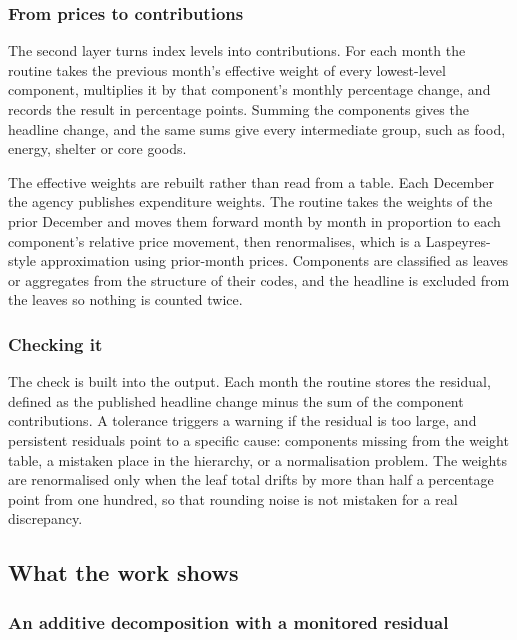 \documentclass[
  british,
  a4paper,
]{article}
\begin{document}
\subsubsection{From prices to
contributions}\label{from-prices-to-contributions}

The second layer turns index levels into contributions. For each month
the routine takes the previous month's effective weight of every
lowest-level component, multiplies it by that component's monthly
percentage change, and records the result in percentage points. Summing
the components gives the headline change, and the same sums give every
intermediate group, such as food, energy, shelter or core goods.

The effective weights are rebuilt rather than read from a table. Each
December the agency publishes expenditure weights. The routine takes the
weights of the prior December and moves them forward month by month in
proportion to each component's relative price movement, then
renormalises, which is a Laspeyres-style approximation using prior-month
prices. Components are classified as leaves or aggregates from the
structure of their codes, and the headline is excluded from the leaves
so nothing is counted twice.

\subsubsection{Checking it}\label{checking-it}

The check is built into the output. Each month the routine stores the
residual, defined as the published headline change minus the sum of the
component contributions. A tolerance triggers a warning if the residual
is too large, and persistent residuals point to a specific cause:
components missing from the weight table, a mistaken place in the
hierarchy, or a normalisation problem. The weights are renormalised only
when the leaf total drifts by more than half a percentage point from one
hundred, so that rounding noise is not mistaken for a real discrepancy.

\subsection{What the work shows}\label{what-the-work-shows}

\subsubsection{An additive decomposition with a monitored
residual}\label{an-additive-decomposition-with-a-monitored-residual}
\end{document}
